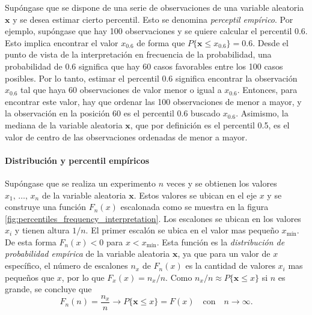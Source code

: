 \documentclass[a4paper]{report}
\newcommand{\x}{\mathbf{x}}
\begin{document}
Supóngase que se dispone de una serie de observaciones de una variable aleatoria \(\x\) y se desea estimar cierto percentil. Esto se denomina \emph{perceptil empírico}. Por ejemplo, supóngase que hay 100 observaciones y se quiere calcular el percentil 0.6. Esto implica encontrar el valor \(x_{0.6}\) de forma que \(P\{\x\leq x_{0.6}\}=0.6\). Desde el punto de vista de la interpretación en frecuencia de la probabilidad, una probabilidad de 0.6 significa que hay 60 casos favorables entre los 100 casos posibles. Por lo tanto, estimar el percentil 0.6 significa encontrar la observación \(x_{0.6}\) tal que haya 60 observaciones de valor menor o igual a \(x_{0.6}\). Entonces, para encontrar este valor, hay que ordenar las 100 observaciones de menor a mayor, y la observación en la posición 60 es el percentil 0.6 buscado \(x_{0.6}\). Asimismo, la mediana de la variable aleatoria \(\x\), que por definición es el percentil 0.5, es el valor de centro de las observaciones ordenadas de menor a mayor.


\paragraph{Distribución y percentil empíricos}

Supóngase que se realiza un experimento \(n\) veces y se obtienen los valores \(x_1,\,\dots,\,x_n\) de la variable aleatoria \(\x\). Estos valores se ubican en el eje \(x\) y se construye una función \(F_n(x)\) escalonada como se muestra en la figura \ref{fig:percentiles_frequency_interpretation}. Los escalones se ubican en los valores \(x_i\) y tienen altura \(1/n\). El primer escalón se ubica en el valor mas pequeño \(x_\textrm{mín}\). De esta forma \(F_n(x)<0\) para \(x<x_\textrm{mín}\). Esta función es la \emph{distribución de probabilidad empírica} de la variable aleatoria \(\x\), ya que para un valor de \(x\) específico, el número de escalones \(n_x\) de \(F_n(x)\) es la cantidad de valores \(x_i\) mas pequeños que \(x\), por lo que \(F_x(x)=n_x/n\). Como \(n_x/n\approx P\{\x\leq x\}\) si \(n\) es grande, se concluye que
\[
 F_n(n)=\frac{n_x}{n}\to P\{\x\leq x\}=F(x)\quad \textrm{con}\quad n\to\infty.
\]
\end{document}
